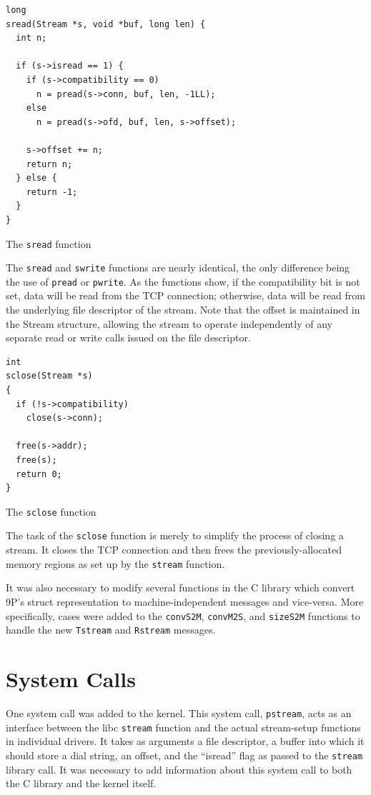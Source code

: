 \documentclass[11pt,american]{report}
\begin{document}
\begin{program}
\begin{verbatim}
long
sread(Stream *s, void *buf, long len) {
  int n;

  if (s->isread == 1) {
    if (s->compatibility == 0)
      n = pread(s->conn, buf, len, -1LL);
    else
      n = pread(s->ofd, buf, len, s->offset);

    s->offset += n;
    return n;
  } else {
    return -1;
  }
}
\end{verbatim}
\caption{The {\tt sread} function}
\label{prog:sread}
\end{program}

The {\tt sread} and {\tt swrite} functions are nearly identical, the only difference being the use of {\tt pread} or {\tt pwrite}. As the functions show, if the compatibility bit is not set, data will be read from the TCP connection; otherwise, data will be read from the underlying file descriptor of the stream. Note that the offset is maintained in the Stream structure, allowing the stream to operate independently of any separate read or write calls issued on the file descriptor.

\begin{program}
\begin{verbatim}
int
sclose(Stream *s)
{
  if (!s->compatibility)
    close(s->conn);

  free(s->addr);
  free(s);
  return 0;
}
\end{verbatim}
\caption{The {\tt sclose} function}
\label{prog:sclose}
\end{program}

The task of the {\tt sclose} function is merely to simplify the process of closing a stream. It closes the TCP connection and then frees the previously-allocated memory regions as set up by the {\tt stream} function.

It was also necessary to modify several functions in the C library which convert 9P's struct representation to machine-independent messages and vice-versa. More specifically, cases were added to the {\tt convS2M}, {\tt convM2S}, and {\tt sizeS2M} functions to handle the new {\tt Tstream} and {\tt Rstream} messages.

\section{System Calls}

One system call was added to the kernel. This system call, {\tt pstream}, acts as an interface between the libc {\tt stream} function and the actual stream-setup functions in individual drivers. It takes as arguments a file descriptor, a buffer into which it should store a dial string, an offset, and the ``isread'' flag as passed to the {\tt stream} library call. It was necessary to add information about this system call to both the C library and the kernel itself.
\end{document}
